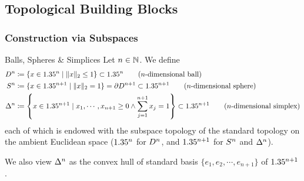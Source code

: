 \subsection{Topological Building Blocks}

\subsubsection{Construction via Subspaces}

\begin{definition}{Balls, Spheres \& Simplices}{}
    Let $n\in\mathbb{N}$. We define \begin{align*}
        D^{n} &\coloneq \{x\in1.35^n\mid\lVert x\rVert_2 \leq 1\} \subset 1.35^n \tag{$n$-dimensional ball} \\
        S^{n} &\coloneq \{x\in1.35^{n+1}\mid\lVert x\rVert_2=1\} = \partial D^{n+1} \subset 1.35^{n+1} \tag{$n$-dimensional sphere} \\
        \Delta^{n} & \coloneqq \left\{x\in1.35^{n+1} \mid x_1,\cdots,x_{n+1}\geq 0 \land \sum_{j=1}^{n+1}x_j=1\right\} \subset 1.35^{n+1} \tag{$n$-dimensional simplex}
    \end{align*}
    each of which is endowed with the subspace topology of the standard topology on the ambient Euclidean space ($1.35^n$ for $D^{n}$, and $1.35^{n+1}$ for $S^{n}$ and $\Delta^{n}$).
\end{definition}

We also view $\Delta^{n}$ as the convex hull of standard basis $\{e_1,e_2,\cdots,e_{n+1}\}$ of $1.35^{n+1}$.

